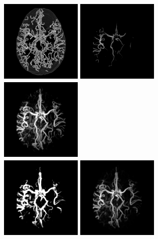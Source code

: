 \begin{figure}[!ht]
  \centering
  \includegraphics[clip = true, trim = 90 20 90 20, height=4cm,width=3.9cm]{Images/Bullitt_GT.png}
  \includegraphics[clip = true, trim = 90 20 90 20, height=4cm,width=3.9cm]{Images/Bullitt_Baseline.png}
  \includegraphics[clip = true, trim = 90 20 90 20, height=4cm,width=3.9cm]{Images/Bullitt_Frangi.png}
  \\
  \includegraphics[clip = true, trim = 90 20 90 20, height=4cm,width=3.9cm]{Images/Bullitt_Jerman.png}
  \includegraphics[clip = true, trim = 90 20 90 20, height=4cm,width=3.9cm]{Images/Bullitt_OOF_GM.png}

\end{figure}
